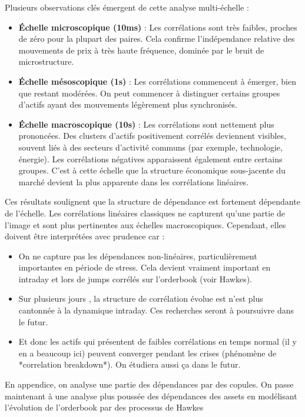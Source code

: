 \documentclass[10pt,a4paper]{article}
\theoremstyle{definition}
\theoremstyle{remark}
\begin{document}
\begin{itemize}
Plusieurs observations clés émergent de cette analyse multi-échelle :
\begin{itemize}
    \item \textbf{Échelle microscopique (10ms)} : Les corrélations sont très faibles, proches de zéro pour la plupart des paires. Cela confirme l'indépendance relative des mouvements de prix à très haute fréquence, dominée par le bruit de microstructure.
    \item \textbf{Échelle mésoscopique (1s)} : Les corrélations commencent à émerger, bien que restant modérées. On peut commencer à distinguer certains groupes d'actifs ayant des mouvements légèrement plus synchronisés.
    \item \textbf{Échelle macroscopique (10s)} : Les corrélations sont nettement plus prononcées. Des clusters d'actifs positivement corrélés deviennent visibles, souvent liés à des secteurs d'activité communs (par exemple, technologie, énergie). Les corrélations négatives apparaissent également entre certains groupes. C'est à cette échelle que la structure économique sous-jacente du marché devient la plus apparente dans les corrélations linéaires.
\end{itemize}

Ces résultats soulignent que la structure de dépendance est fortement dépendante de l'échelle. Les corrélations linéaires classiques ne capturent qu'une partie de l'image et sont plus pertinentes aux échelles macroscopiques. Cependant, elles doivent être interprétées avec prudence car :
\begin{itemize}
    \item On ne capture pas les dépendances non-linéaires, particulièrement importantes en période de stress. Cela devient vraiment important en intraday et lors de jumps corrélés sur l'orderbook (voir Hawkes).
    \item Sur plusieurs jours , la structure de corrélation évolue est n'est plus cantonnée à la dynamique intraday. Ces recherches seront à poursuivre dans le futur.
    \item Et donc les actifs qui présentent de faibles corrélations en temps normal (il y en a beaucoup ici) peuvent converger pendant les crises (phénomène de *correlation breakdown*). On étudiera aussi ça dans le futur.
\end{itemize}

En appendice, on analyse une partie des dépendances par des copules. On passe maintenant à une analyse plus poussée des dépendances des assets en modélisant l'évolution de l'orderbook par des processus de Hawkes


\end{itemize}
\end{document}

